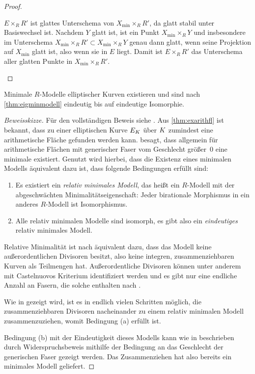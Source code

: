 \begin{Satz}
\begin{proof}
\begin{enumerate}[resume*,start=1]
      $E\times_R R'$ ist glattes Unterschema von
      ${X_{\text{min}}\times_R R'}$, da glatt stabil unter Basiswechsel
      ist. Nachdem $Y$ glatt ist, ist ein Punkt 
      ${X_{\text{min}}\times_R Y}$ und insbesondere im Unterschema
      ${X_{\text{min}}\times_R R'\subset X_{\text{min}}\times_R Y}$
      genau dann glatt, wenn seine Projektion auf $X_{\text{min}}$
      glatt ist, also wenn sie in $E$ liegt. Damit ist ${E\times_R R'}$
      das Unterschema aller glatten Punkte in
      ${X_{\text{min}}\times_R R'}$.
      \qedhere
    \end{enumerate}
  \end{proof}
\end{Satz}

\begin{Satz}\label{thm:exminmodell}
  Minimale $R$-Modelle elliptischer Kurven existieren und sind nach
  \ref{thm:eigminmodell} eindeutig bis auf eindeutige Isomorphie.
  \begin{proof}[Beweisskizze]
    Für den vollständigen Beweis siehe \cite[Theorem~9.3.21]{liu}.
    Aus \ref{thm:exarithfl} ist bekannt, dass zu einer elliptischen
    Kurve $E_{K}$ über $K$ zumindest eine arithmetische Fläche
    gefunden werden kann.
    \cite[Theorem~9.3.21]{liu} besagt, dass allgemein für
    arithmetische Flächen mit generischer Faser vom Geschlecht
    größer~0 eine minimale existiert.
    Genutzt wird hierbei, dass die Existenz eines minimalen Modells
    äquivalent dazu ist, dass folgende Bedingungen erfüllt sind:
    \begin{enumerate}[label=(\alph*)]
    \item Es existiert ein \emph{relativ minimales Modell}, das heißt
      ein $R$-Modell mit der abgeschwächten Minimalitätseigenschaft:
      Jeder birationale Morphismus in ein anderes $R$-Modell ist
      Isomorphismus.
    \item Alle relativ minimalen Modelle sind isomorph, es gibt also
      ein \emph{eindeutiges} relativ minimales Modell.
    \end{enumerate}
    Relative Minimalität ist nach \cite[Theorem~9.2.2]{liu} äquivalent
    dazu, dass das Modell keine außerordentlichen Divisoren besitzt,
    also keine integren, zusammenziehbaren Kurven als Teilmengen
    hat.
    Außerordentliche Divisoren können unter anderem mit Castelnuovos
    Kriterium \cite[Theorem~9.3.8]{liu} identifiziert werden und es
    gibt nur eine endliche Anzahl an Fasern, die solche enthalten nach
    \cite[Lemma~9.3.17]{liu}.

    Wie in \cite[Proposition~9.3.19]{liu} gezeigt wird, ist es in
    endlich vielen Schritten möglich, die zusammenziehbaren Divisoren
    nacheinander zu einem relativ minimalen Modell zusammenzuziehen,
    womit Bedingung (a) erfüllt ist.

    Bedingung (b) mit der Eindeutigkeit dieses Modells kann wie in
    \cite[Theorem~9.3.21]{liu} beschrieben durch Widerspruchsbeweis
    mithilfe der Bedingung an das Geschlecht der generischen Faser
    gezeigt werden.
    Das Zusammenziehen hat also bereits ein minimales Modell geliefert.
  \end{proof}
\end{Satz}

